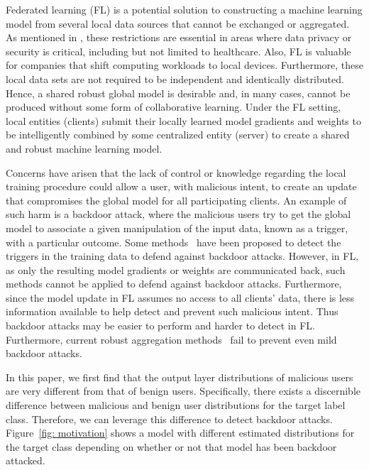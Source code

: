 \documentclass{article} %
\newcommand{\yli}[1]{{\color{cyan}#1}}
\newcommand{\mh}[1]{{\color{red}#1}}
\begin{document}
Federated learning (FL) is a potential solution to constructing a machine learning model from several local data sources that cannot be exchanged or aggregated. As mentioned in \cite{fed-learn}, these restrictions are essential in areas where data privacy or security is critical, including but not limited to healthcare.  Also, FL is valuable for companies that shift computing workloads to local devices. Furthermore, these local data sets are not required to be independent and identically distributed. Hence, a shared robust global model is desirable and, in many cases, cannot be produced without some form of collaborative learning.  Under the FL setting, local entities (clients) submit their locally learned model gradients and weights to be intelligently combined by some centralized entity (server) to create a shared and robust machine learning model.

Concerns have arisen that the lack of control or knowledge regarding the local training procedure could allow a user, with malicious intent, to create an update that compromises the global model for all participating clients. An example of such harm is a backdoor attack, 
\yli{where the malicious users try to get the global model to associate a given manipulation of the input data, known as a trigger, with a particular outcome.}
\yli{Some methods~\cite{kurita2020weight,qi2020onion,li2021backdoor} have been proposed to detect the triggers in the training data to defend against backdoor attacks.}
However, in FL, as only the resulting model gradients or weights are communicated back, \yli{such methods cannot be applied to defend against backdoor attacks.}
Furthermore, since the model update in FL assumes no access to all clients' data, there is less information available to help detect and prevent such malicious intent. Thus backdoor attacks may be easier to perform and harder to detect in FL. 
Furthermore, current robust aggregation methods~\cite{trim-mean} fail to prevent even mild backdoor attacks.

In this paper, we first find that the output layer distributions of malicious users are very different from that of benign users. Specifically, there exists a discernible difference between malicious and benign user distributions for the target label class. Therefore, we can leverage this difference to detect backdoor attacks. Figure~\ref{fig: motivation} shows a model with different estimated distributions for the target class depending on whether or not that model has been backdoor attacked. 
\end{document}
